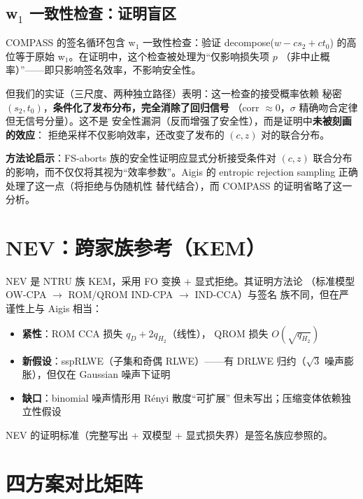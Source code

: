 \documentclass[11pt,a4paper]{ctexart}
\begin{document}
\subsection{w$_1$ 一致性检查：证明盲区}

\begin{warnbox}[实证发现与证明的张力]
COMPASS 的签名循环包含 w$_1$ 一致性检查：验证 decompose($w - c s_2 + c t_0$)
的高位等于原始 w$_1$。在证明中，这个检查被处理为``仅影响损失项 $p$
（非中止概率）''——即只影响签名效率，不影响安全性。

但我们的实证（三尺度、两种独立路径）表明：这一检查的接受概率依赖
秘密 $(s_2, t_0)$，\textbf{条件化了发布分布，完全消除了回归信号}
（corr $\approx 0$，$\sigma$ 精确吻合定律但无信号分量）。这不是
安全性漏洞（反而增强了安全性），而是证明中\textbf{未被刻画的效应}：
拒绝采样不仅影响效率，还改变了发布的 $(c, z)$ 对的联合分布。
\end{warnbox}

\textbf{方法论启示}：FS-aborts 族的安全性证明应显式分析接受条件对
$(c, z)$ 联合分布的影响，而不仅仅将其视为``效率参数''。Aigis 的
entropic rejection sampling 正确处理了这一点（将拒绝与伪随机性
替代结合），而 COMPASS 的证明省略了这一分析。

\section{NEV：跨家族参考（KEM）}

NEV 是 NTRU 族 KEM，采用 FO 变换 + 显式拒绝。其证明方法论
（标准模型 OW-CPA $\to$ ROM/QROM IND-CPA $\to$ IND-CCA）与签名
族不同，但在严谨性上与 Aigis 相当：

\begin{itemize}
  \item \textbf{紧性}：ROM CCA 损失 $q_D + 2q_{H_2}$（线性），
        QROM 损失 $O(\sqrt{q_{H_2}})$
  \item \textbf{新假设}：sspRLWE（子集和奇偶 RLWE）——有 DRLWE
        归约（$\sqrt{3}$ 噪声膨胀），但仅在 Gaussian 噪声下证明
  \item \textbf{缺口}：binomial 噪声情形用 Rényi 散度``可扩展''
        但未写出；压缩变体依赖独立性假设
\end{itemize}

NEV 的证明标准（完整写出 + 双模型 + 显式损失界）是签名族应参照的。

\section{四方案对比矩阵}
\end{document}
